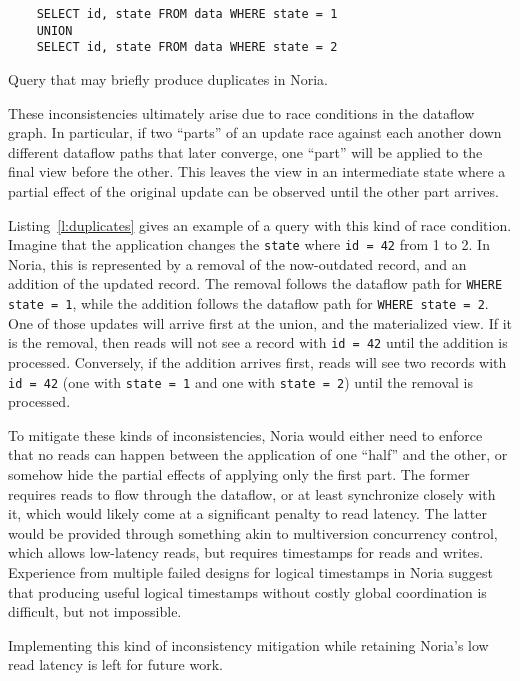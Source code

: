 \begin{listing}[h]
  \begin{verbatim}
    SELECT id, state FROM data WHERE state = 1
    UNION
    SELECT id, state FROM data WHERE state = 2
  \end{verbatim}
  \caption{Query that may briefly produce duplicates in Noria.}
  \label{l:duplicates}
\end{listing}

These inconsistencies ultimately arise due to race conditions in the dataflow
graph. In particular, if two ``parts'' of an update race against each another
down different dataflow paths that later converge, one ``part'' will be applied
to the final view before the other. This leaves the view in an intermediate
state where a partial effect of the original update can be observed until the
other part arrives.

Listing~\ref{l:duplicates} gives an example of a query with this kind of race
condition. Imagine that the application changes the \texttt{state} where
\texttt{id = 42} from 1 to 2. In Noria, this is represented by a removal of the
now-outdated record, and an addition of the updated record. The removal follows
the dataflow path for \texttt{WHERE state = 1}, while the addition follows the
dataflow path for \texttt{WHERE state = 2}. One of those updates will arrive
first at the union, and the materialized view. If it is the removal, then reads
will not see a record with \texttt{id = 42} until the addition is processed.
Conversely, if the addition arrives first, reads will see two records with
\texttt{id = 42} (one with \texttt{state = 1} and one with \texttt{state = 2})
until the removal is processed.

To mitigate these kinds of inconsistencies, Noria would either need to enforce
that no reads can happen between the application of one ``half'' and the other,
or somehow hide the partial effects of applying only the first part. The former
requires reads to flow through the dataflow, or at least synchronize closely
with it, which would likely come at a significant penalty to read latency. The
latter would be provided through something akin to multiversion concurrency
control, which allows low-latency reads, but requires timestamps for reads and
writes. Experience from multiple failed designs for logical timestamps in Noria
suggest that producing useful logical timestamps without costly global
coordination is difficult, but not impossible.

Implementing this kind of inconsistency mitigation while retaining Noria's low
read latency is left for future work.

